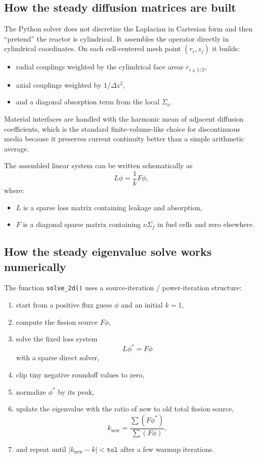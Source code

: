 \documentclass[11pt]{article}
\begin{document}
\subsection{How the steady diffusion matrices are built}

The Python solver does not discretize the Laplacian in Cartesian form and then
``pretend'' the reactor is cylindrical.  It assembles the operator directly in
cylindrical coordinates.  On each cell-centered mesh point $(r_i,z_j)$ it builds:
\begin{itemize}
  \item radial couplings weighted by the cylindrical face areas $r_{i\pm 1/2}$,
  \item axial couplings weighted by $1/\Delta z^2$,
  \item and a diagonal absorption term from the local $\Sigma_a$.
\end{itemize}

Material interfaces are handled with the harmonic mean of adjacent diffusion
coefficients, which is the standard finite-volume-like choice for discontinuous
media because it preserves current continuity better than a simple arithmetic
average.

The assembled linear system can be written schematically as
\[
L\phi = \frac{1}{k}F\phi,
\]
where:
\begin{itemize}
  \item $L$ is a sparse loss matrix containing leakage and absorption,
  \item $F$ is a diagonal sparse matrix containing $\nu\Sigma_f$ in fuel cells
        and zero elsewhere.
\end{itemize}

\subsection{How the steady eigenvalue solve works numerically}

The function \texttt{solve\_2d()} uses a source-iteration / power-iteration
structure:
\begin{enumerate}
  \item start from a positive flux guess $\phi$ and an initial $k=1$,
  \item compute the fission source $F\phi$,
  \item solve the fixed loss system
        \[
        L\phi^{*} = F\phi
        \]
        with a sparse direct solver,
  \item clip tiny negative roundoff values to zero,
  \item normalize $\phi^{*}$ by its peak,
  \item update the eigenvalue with the ratio of new to old total fission source,
        \[
        k_{\mathrm{new}} = \frac{\sum(F\phi^{*})}{\sum(F\phi)},
        \]
  \item and repeat until $|k_{\mathrm{new}}-k| < \texttt{tol}$ after a few warmup
        iterations.
\end{enumerate}
\end{document}
